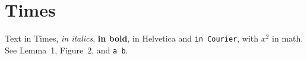 \documentclass{article}
\begin{document}
\section{Times}
Text in Times, \emph{in italics}, \textbf{in bold}, \textsf{in Helvetica} and
\texttt{in Courier}, with $x^2$ in math. See Lemma~1, \textsf{Figure~2}, and
\texttt{a~b}.
\end{document}
